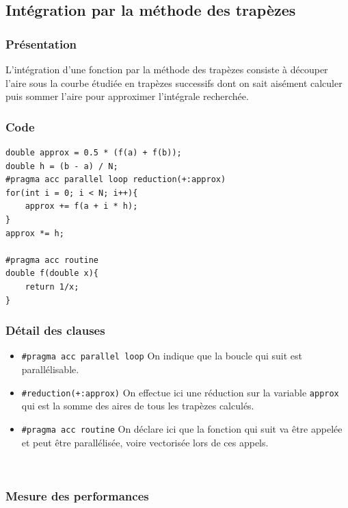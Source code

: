 \documentclass{article}
\begin{document}
\FloatBarrier

\subsection{Intégration par la méthode des trapèzes}

\subsubsection{Présentation}

L'intégration d'une fonction par la méthode des trapèzes consiste à découper l'aire sous la courbe étudiée en trapèzes successifs dont on sait aisément calculer puis sommer l'aire pour approximer l'intégrale recherchée.

\subsubsection{Code}

\begin{lstlisting}[caption={Implémentation de l'intégration par la méthode des trapèzes \textit{OpenACC}}]
double approx = 0.5 * (f(a) + f(b));
double h = (b - a) / N;
#pragma acc parallel loop reduction(+:approx)
for(int i = 0; i < N; i++){
	approx += f(a + i * h);
}
approx *= h;

#pragma acc routine
double f(double x){
	return 1/x;
}
\end{lstlisting}

\subsubsection{Détail des clauses}

\begin{itemize}
	\item \texttt{\#pragma acc parallel loop} On indique que la boucle qui suit est parallélisable.
	\item \texttt{\#reduction(+:approx)} On effectue ici une réduction sur la variable \texttt{approx} qui est la somme des aires de tous les trapèzes calculés.
	\item \texttt{\#pragma acc routine} On déclare ici que la fonction qui suit va être appelée et peut être parallélisée, voire vectorisée lors de ces appels.
\end{itemize}

~\\

\subsubsection{Mesure des performances}
\end{document}
